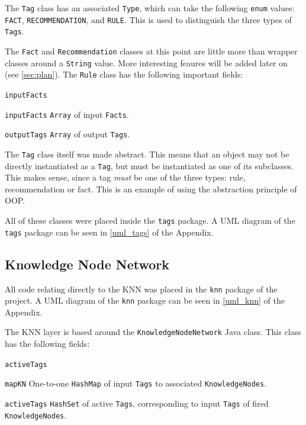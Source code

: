 \documentclass[titlepage,11pt]{article}
\newcommand{\code}[1]{\texttt{#1}}
\begin{document}
The \code{Tag} class has an associated \code{Type}, which can take the following \code{enum} values: \code{FACT}, \code{RECOMMENDATION}, and \code{RULE}. This is used to distinguish the three types of \code{Tags}.

The \code{Fact} and \code{Recommendation} classes at this point are little more than wrapper classes around a \code{String} value. More interesting feaures will be added later on (see \autoref{sec:plan}). The \code{Rule} class has the following important fields:

\begin{labeling}{\code{inputFacts}}
	\item[\code{inputFacts}] \code{Array} of input \code{Facts}.
	\item[\code{outputTags}] \code{Array} of output \code{Tags}.
\end{labeling}

The \code{Tag} class itself was made abstract. This means that an object may not be directly instantiated as a \code{Tag}, but must be instantiated as one of its subclasses. This makes sense, since a tag \emph{must} be one of the three types: rule, recommendation or fact. This is an example of using the abstraction principle of OOP.

All of these classes were placed inside the \code{tags} package. A UML diagram of the \code{tags} package can be seen in \autoref{uml_tags} of the Appendix.

\subsection{Knowledge Node Network}

All code relating directly to the KNN was placed in the \code{knn} package of the project. A UML diagram of the \code{knn} package can be seen in \autoref{uml_knn} of the Appendix.

The KNN layer is based around the \code{KnowledgeNodeNetwork} Java class. This class has the following fields:

\begin{labeling}{\code{activeTags}}
	\item[\code{mapKN}] One-to-one \code{HashMap} of input \code{Tags} to associated \code{KnowledgeNodes}.
	\item[\code{activeTags}] \code{HashSet} of active \code{Tags}, corresponding to input \code{Tags} of fired \code{KnowledgeNodes}.
\end{labeling}
\end{document}
